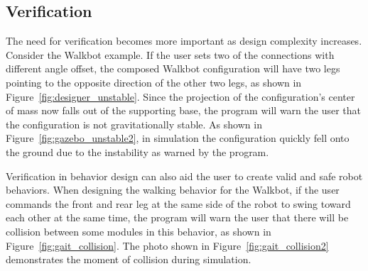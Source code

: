 \documentclass[conference]{IEEEtran}
\theoremstyle{definition}
\begin{document}
\subsection{Verification}
The need for verification becomes more important as design complexity increases. Consider the Walkbot example. If the user sets two of the connections with different angle offset, the composed Walkbot configuration will have two legs pointing to the opposite direction of the other two legs, as shown in Figure~\ref{fig:designer_unstable}. Since the projection of the configuration's center of mass now falls out of the supporting base, the program will warn the user that the configuration is not gravitationally stable. As shown in Figure~\ref{fig:gazebo_unstable2}, in simulation the configuration quickly fell onto the ground due to the instability as warned by the program. 

Verification in behavior design can also aid the user to create valid and safe robot behaviors. When designing the walking behavior for the Walkbot, if the user commands the front and rear leg at the same side of the robot to swing toward each other at the same time, the program will warn the user that there will be collision between some modules in this behavior, as shown in Figure~\ref{fig:gait_collision}. The photo shown in Figure~\ref{fig:gait_collision2} demonstrates the moment of collision during simulation.
 
\end{document}
